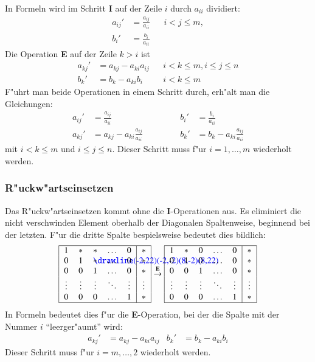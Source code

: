 In Formeln wird im Schritt {\bf I} auf der Zeile $i$
durch $a_{ii}$ dividiert:
\begin{align*}
a_{ij}'&=\frac{a_{ij}}{a_{ii}}&& i < j \le m,\\
b_i'&=\frac{b_i}{a_{ii}}
\end{align*}
Die Operation {\bf E} auf der Zeile $k>i$ ist
\begin{align*}
a_{kj}'&=a_{kj}-a_{ki}a_{ij}&&i < k \le m, i \le j\le n\\
b_k'&=b_k-a_{ki}b_i&&i < k \le m
\end{align*}
F"uhrt man beide Operationen in einem Schritt durch, erh"alt man die
Gleichungen:
\begin{equation}
\begin{aligned}
a_{ij}'&=\frac{a_{ij}}{a_{ii}}&&&b_i'&=\frac{b_i}{a_{ii}}\\
a_{kj}'&=a_{kj}-a_{ki}\frac{a_{ij}}{a_{ii}}&
&\qquad&b_k'&=b_k-a_{ki}\frac{a_{ij}}{a_{ii}}
\end{aligned}
\label{vorwaertsreduktion}
\end{equation}
mit $i < k\le m$ und $i\le j\le n$. Dieser Schritt muss f"ur $i=1,\dots,m$
wiederholt werden.

\subsubsection{R"uckw"artseinsetzen}
Das R"uckw"artseinsetzen kommt ohne die {\bf I}-Operationen aus.
Es eliminiert die nicht verschwinden Element oberhalb der Diagonalen
Spaltenweise, beginnend bei der letzten. F"ur die dritte Spalte bespielsweise
bedeutet dies bildlich:
\begin{gather*}
\begin{tabular}{|>{$}c<{$}>{$}c<{$}>{$}c<{$}>{$}c<{$}>{$}c<{$}|>{$}c<{$}|}
\hline
1&*&*&\dots&0&*\\
0&1&\begin{picture}(0,0)
\color{blue}\drawline(-2,22)(-2,-2)(8,-2)(8,22)
\end{picture}%
*&\dots&0&*\\
0&0&1&\dots&0&*\\
\vdots&\vdots& \vdots& \ddots& \vdots&\vdots\\
0&0&0&\dots&1&*\\
\hline
\end{tabular}
\overset{\text{\bf E}}\rightarrow
\begin{tabular}{|>{$}c<{$}>{$}c<{$}>{$}c<{$}>{$}c<{$}>{$}c<{$}|>{$}c<{$}|}
\hline
1&*&0&\dots&0&*\\
0&1&0&\dots&0&*\\
0&0&1&\dots&0&*\\
\vdots& \vdots&\vdots& \ddots& \vdots&\vdots\\
0&0&0&\dots&1&*\\
\hline
\end{tabular}
\end{gather*}
In Formeln bedeutet dies f"ur die {\bf E}-Operation, bei der die
Spalte mit der Nummer $i$ ``leerger"aumt'' wird:
\begin{align}
a_{kj}'&=a_{kj}- a_{ki} a_{ij}
&
b_k'&=b_k- a_{ki}b_i
\label{rueckwaertseinsetzen}
\end{align}
Dieser Schritt muss f"ur $i=m,\dots,2$ wiederholt werden.
